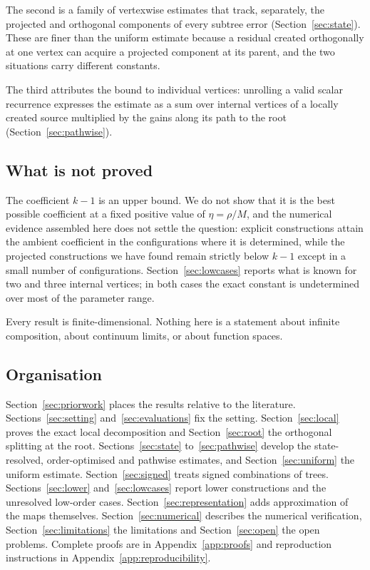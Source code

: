 \documentclass[11pt]{amsart}
\theoremstyle{definition}
\theoremstyle{remark}
\begin{document}
The second is a family of vertexwise estimates that track, separately, the projected and
orthogonal components of every subtree error (Section~\ref{sec:state}). These are finer
than the uniform estimate because a residual created orthogonally at one vertex can
acquire a projected component at its parent, and the two situations carry different
constants.

The third attributes the bound to individual vertices: unrolling a valid scalar
recurrence expresses the estimate as a sum over internal vertices of a locally created
source multiplied by the gains along its path to the root (Section~\ref{sec:pathwise}).

\subsection*{What is not proved}

The coefficient $k-1$ is an upper bound. We do not show that it is the best possible
coefficient at a fixed positive value of $\eta=\rho/M$, and the numerical evidence
assembled here does not settle the question: explicit constructions attain the ambient
coefficient in the configurations where it is determined, while the projected
constructions we have found remain strictly below $k-1$ except in a small number of
configurations. Section~\ref{sec:lowcases} reports what is known for two and three
internal vertices; in both cases the exact constant is undetermined over most of the
parameter range.

Every result is finite-dimensional. Nothing here is a statement about infinite
composition, about continuum limits, or about function spaces.

\subsection*{Organisation}

Section~\ref{sec:priorwork} places the results relative to the literature.
Sections~\ref{sec:setting} and~\ref{sec:evaluations} fix the setting.
Section~\ref{sec:local} proves the exact local decomposition and
Section~\ref{sec:root} the orthogonal splitting at the root. Sections~\ref{sec:state}
to~\ref{sec:pathwise} develop the state-resolved, order-optimised and pathwise estimates,
and Section~\ref{sec:uniform} the uniform estimate. Section~\ref{sec:signed} treats signed
combinations of trees. Sections~\ref{sec:lower} and~\ref{sec:lowcases} report lower
constructions and the unresolved low-order cases. Section~\ref{sec:representation} adds
approximation of the maps themselves. Section~\ref{sec:numerical} describes the numerical
verification, Section~\ref{sec:limitations} the limitations and
Section~\ref{sec:open} the open problems. Complete proofs are in
Appendix~\ref{app:proofs} and reproduction instructions in
Appendix~\ref{app:reproducibility}.
\end{document}
